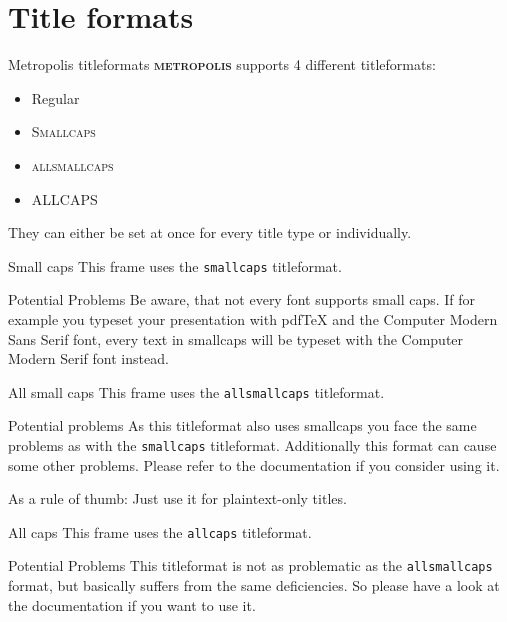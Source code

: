 \documentclass[10pt]{beamer} %
\newcommand{\themename}{\textbf{\textsc{metropolis}}\xspace}
\begin{document}
\section{Title formats}
\begin{frame}{Metropolis titleformats}
	\themename supports 4 different titleformats:
	\begin{itemize}
		\item Regular
		\item \textsc{Smallcaps}
		\item \textsc{allsmallcaps}
		\item ALLCAPS
	\end{itemize}
	They can either be set at once for every title type or individually.
\end{frame}
{
\begin{frame}{Small caps}
	This frame uses the \texttt{smallcaps} titleformat.

	\begin{alertblock}{Potential Problems}
		Be aware, that not every font supports small caps. If for example you typeset your presentation with pdfTeX and the Computer Modern Sans Serif font, every text in smallcaps will be typeset with the Computer Modern Serif font instead.
	\end{alertblock}
\end{frame}
}
{
\begin{frame}{All small caps}
	This frame uses the \texttt{allsmallcaps} titleformat.

	\begin{alertblock}{Potential problems}
		As this titleformat also uses smallcaps you face the same problems as with the \texttt{smallcaps} titleformat. Additionally this format can cause some other problems. Please refer to the documentation if you consider using it.

		As a rule of thumb: Just use it for plaintext-only titles.
	\end{alertblock}
\end{frame}
}
{
\begin{frame}{All caps}
	This frame uses the \texttt{allcaps} titleformat.

	\begin{alertblock}{Potential Problems}
		This titleformat is not as problematic as the \texttt{allsmallcaps} format, but basically suffers from the same deficiencies. So please have a look at the documentation if you want to use it.
	\end{alertblock}
\end{frame}
}
\end{document}
